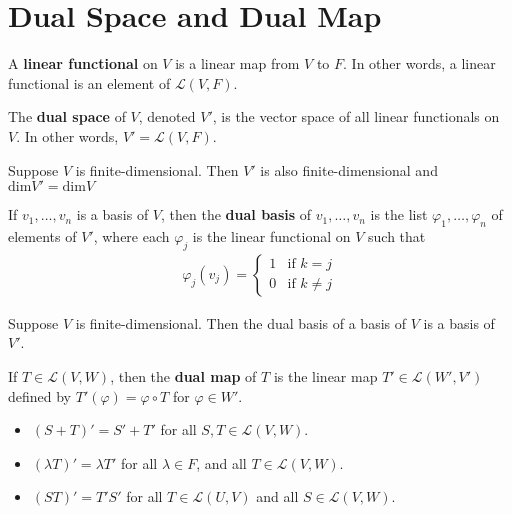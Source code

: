 \documentclass{memoir}
\begin{document}
\section{Dual Space and Dual Map}
\label{sec:dual_space_and_dual_map}
\begin{defn}
	A \textbf{linear functional} on $V$ is a linear map from $V$ to $F$. In other words, a linear functional is an element of $\mathcal{L}(V,F)$.
\end{defn}
\begin{defn}
	The \textbf{dual space} of $V$, denoted $V'$, is the vector space of all linear functionals on $V $. In other words, $V' = \mathcal{L}(V,F)$.
\end{defn}
\begin{cor}
	Suppose $V $ is finite-dimensional. Then $V'$ is also finite-dimensional and $ \textrm{dim}V' = \textrm{dim}V$
\end{cor}
\begin{defn}
	If $v_1,\ldots,v_n$ is a basis of $V$, then the \textbf{dual basis} of $v_1,\ldots,v_n$ is the list $\varphi_1,\ldots,\varphi_n$ of elements of $V'$, where each $\varphi_j$ is the linear functional on $V$ such that
	\begin{align*}
		\varphi_j (v_j) = \begin{cases}
			1 & \text{if } k = j\\
			0 & \text{if } k \neq j
		\end{cases}
	\end{align*}
\end{defn}
\begin{lemma}
	Suppose $V$ is finite-dimensional. Then the dual basis of a basis of $V$ is a basis of $V'$.
\end{lemma}

\begin{defn}
	If $T \in \mathcal{L}(V,W)$, then the \textbf{dual map} of $T$ is the linear map $T' \in \mathcal{L}(W',V')$ defined by $T'(\varphi) = \varphi \circ T$ for $\varphi \in W'$.
\end{defn}
\begin{lemma}
	\begin{itemize}
		\item $(S+T)' = S' + T'$ for all $S,T \in \mathcal{L}(V,W)$.
		\item $(\lambda T)' = \lambda T'$ for all $\lambda \in F$, and all $T \in \mathcal{L}(V,W)$.
		\item $(ST)' = T'S'$ for all $T \in \mathcal{L}(U,V)$ and all $S \in \mathcal{L}(V,W)$.
	\end{itemize}
\end{lemma}
\end{document}
